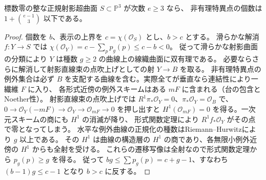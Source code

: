 \begin{lemma}\label{lem:normal-surface-nonrational-point-count}
標数零の整な正規射影超曲面 $S\subset\mathbb P^3$ が次数 $e\ge3$ なら、
非有理特異点の個数は $1+\binom{e-1}{3}$ 以下である。
\end{lemma}
\begin{proof}
個数を $b$、表示の上界を $c=\chi(\mathcal O_S)$ とし、$b>c$ とする。
滑らかな解消 $f:Y\to S$ では $\chi(\mathcal O_Y)=c-\sum_p p_g(p)\le c-b<0$。
従って滑らかな射影曲面の分類により $Y$ は種数 $g\ge2$ の曲線上の線織曲面に双有理である。
必要ならさらに解消して射影直線束の点吹上げとしての射 $Y\to B$ を取る。
非有理特異点の例外集合は必ず $B$ を支配する曲線を含む。実際全てが垂直なら連結性により一繊維 $F$ に入り、
各形式近傍の例外スキームはある $mF$ に含まれる（台の包含とNoether性）。
射影直線束の点吹上げでは $R^1\pi_*\mathcal O_Y=0$、$\pi_*\mathcal O_Y=\mathcal O_B$ で、
$0\to\mathcal O_Y(-mF)\to\mathcal O_Y\to\mathcal O_{mF}\to0$ を押し出すと
$H^1(\mathcal O_{mF})=0$ を得る。一次元スキームの商にも $H^1$ の消滅が降り、
形式関数定理により $R^1 f_*\mathcal O_Y$ がその点で零となってしまう。
水平な例外曲線の正規化の種数はRiemann--Hurwitzにより $g$ 以上である。
その $H^1$ は曲線の構造層の $H^1$ の商であり、各無限小例外近傍の $H^1$ からも全射を受ける。
これらの遷移写像は全射なので形式関数定理から $p_g(p)\ge g$ を得る。
従って $bg\le\sum p_g(p)=c+g-1$、すなわち $(b-1)g\le c-1$ となり $b>c$ に反する。
\end{proof}

